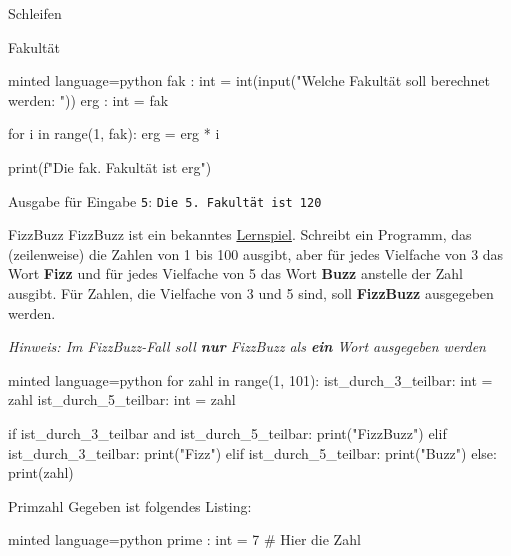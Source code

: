 \begin{task}[points=auto]{Schleifen}
\begin{subtask*}[points=0]{Fakultät }
        \begin{solution}
            \begin{codeBlock}[]{minted language=python}
            fak : int = int(input("Welche Fakultät soll berechnet werden: "))
            erg : int = fak

            for i in range(1, fak):
                erg = erg * i

            print(f"Die {fak}. Fakultät ist {erg}")
            \end{codeBlock}

            Ausgabe für Eingabe \texttt{5}: \texttt{Die 5. Fakultät ist 120}
        \end{solution}
    \end{subtask*}
    \begin{subtask*}[points=0]{FizzBuzz }
        FizzBuzz ist ein bekanntes \href{https://en.wikipedia.org/wiki/Fizz_buzz}{Lernspiel}. Schreibt ein Programm, das (zeilenweise) die Zahlen von 1 bis 100 ausgibt, aber für jedes Vielfache von 3 das Wort \textbf{Fizz} und für jedes Vielfache von 5 das Wort \textbf{Buzz} anstelle der Zahl ausgibt. Für Zahlen, die Vielfache von 3 und 5 sind, soll \textbf{FizzBuzz} ausgegeben werden.

        \textit{Hinweis: Im FizzBuzz-Fall soll \textbf{nur} FizzBuzz als \textbf{ein} Wort ausgegeben werden}

        \begin{solution}
            \begin{codeBlock}[]{minted language=python}
                for zahl in range(1, 101):
                    ist_durch_3_teilbar: int = zahl %
                    ist_durch_5_teilbar: int = zahl %

                    if ist_durch_3_teilbar and ist_durch_5_teilbar:
                        print("FizzBuzz")
                    elif ist_durch_3_teilbar:
                        print("Fizz")
                    elif ist_durch_5_teilbar:
                        print("Buzz")
                    else:
                        print(zahl)
            \end{codeBlock}
        \end{solution}
    \end{subtask*}
    \begin{subtask*}[points=0]{Primzahl }
        Gegeben ist folgendes Listing:
        \begin{codeBlock}[]{minted language=python}
                prime : int = 7 # Hier die Zahl


\end{codeBlock}
\end{subtask*}
\end{task}
